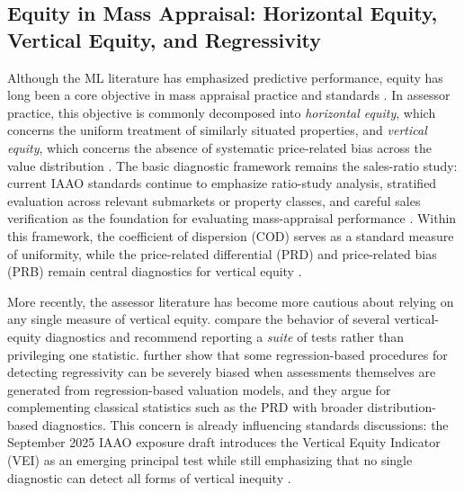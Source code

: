 \documentclass[12pt, draft]{article}
\theoremstyle{plain}
\theoremstyle{definition}
\newcommand{\1}{\mathbf{1}}
\begin{document}
\subsection{Equity in Mass Appraisal: Horizontal Equity, Vertical Equity, and Regressivity}

Although the ML literature has emphasized predictive performance, equity has long been a core objective in mass appraisal practice and standards \cite{IAAO2013Ratio,IAAO2025Mass,Quintos2014}. In assessor practice, this objective is commonly decomposed into \emph{horizontal equity}, which concerns the uniform treatment of similarly situated properties, and \emph{vertical equity}, which concerns the absence of systematic price-related bias across the value distribution \cite{10578d49-78f8-3ef9-8277-9b6add2bd071,cornia2006property,McMillenSingh2023}. The basic diagnostic framework remains the sales-ratio study: current IAAO standards continue to emphasize ratio-study analysis, stratified evaluation across relevant submarkets or property classes, and careful sales verification as the foundation for evaluating mass-appraisal performance \cite{IAAO2013Ratio,IAAO2020SalesVerification,IAAO2025Mass}. Within this framework, the coefficient of dispersion (COD) serves as a standard measure of uniformity, while the price-related differential (PRD) and price-related bias (PRB) remain central diagnostics for vertical equity \cite{IAAO2013Ratio,IAAO2025Mass}.

More recently, the assessor literature has become more cautious about relying on any single measure of vertical equity. \textcite{IAAO2023VerticalReview} compare the behavior of several vertical-equity diagnostics and recommend reporting a \emph{suite} of tests rather than privileging one statistic. \textcite{McMillenSingh2023} further show that some regression-based procedures for detecting regressivity can be severely biased when assessments themselves are generated from regression-based valuation models, and they argue for complementing classical statistics such as the PRD with broader distribution-based diagnostics. This concern is already influencing standards discussions: the September 2025 IAAO exposure draft introduces the Vertical Equity Indicator (VEI) as an emerging principal test while still emphasizing that no single diagnostic can detect all forms of vertical inequity \cite{IAAO2025ExposureRatio}.
\end{document}
